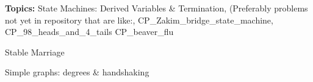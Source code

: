 \documentclass[handout]{mcs}
\begin{document}
\renewcommand{\reading}{Ch.~\bref{derived_var_subsec}, Derived
  Variables; Ch.~\bref{stablemarriagesec}, Stable Marriage;
  Ch.~\bref{degreessec}, Graph Isomorphism}


\begin{staffnotes}
\textbf{Topics:}
State Machines: Derived Variables & Termination,
(Preferably problems not yet in repository that are like:,
{CP_Zakim_bridge_state_machine},
{CP_98_heads_and_4_tails}
{CP_beaver_flu}

Stable Marriage

Simple graphs: degrees \& handshaking

\end{staffnotes}










\end{document}
